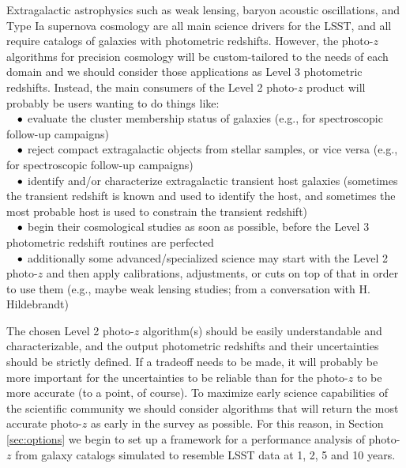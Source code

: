 \documentclass[DM,lsstdraft,toc]{lsstdoc}
\begin{document}
Extragalactic astrophysics such as weak lensing, baryon acoustic oscillations, and Type Ia supernova cosmology are all main science drivers for the LSST, and all require catalogs of galaxies with photometric redshifts. However, the photo-$z$ algorithms for precision cosmology will be custom-tailored to the needs of each domain and we should consider those applications as Level 3 photometric redshifts. Instead, the main consumers of the Level 2 photo-$z$ product will probably be users wanting to do things like: \\
${\rm \ \ \ }\bullet$ evaluate the cluster membership status of galaxies (e.g., for spectroscopic follow-up campaigns)\\
${\rm \ \ \ }\bullet$ reject compact extragalactic objects from stellar samples, or vice versa (e.g., for spectroscopic follow-up campaigns) \\
${\rm \ \ \ }\bullet$ identify and/or characterize extragalactic transient host galaxies (sometimes the transient redshift is known and used to identify the host, and sometimes the most probable host is used to constrain the transient redshift) \\
${\rm \ \ \ }\bullet$ begin their cosmological studies as soon as possible, before the Level 3 photometric redshift routines are perfected \\
${\rm \ \ \ }\bullet$ additionally some advanced/specialized science may start with the Level 2 photo-$z$ and then apply calibrations, adjustments, or cuts on top of that in order to use them (e.g., maybe weak lensing studies; from a conversation with H. Hildebrandt) 

\smallskip
The chosen Level 2 photo-$z$ algorithm(s) should be easily understandable and characterizable, and the output photometric redshifts and their uncertainties should be strictly defined. If a tradeoff needs to be made, it will probably be more important for the uncertainties to be reliable than for the photo-$z$ to be more accurate (to a point, of course). To maximize early science capabilities of the scientific community we should consider algorithms that will return the most accurate photo-$z$ as early in the survey as possible. For this reason, in Section \ref{sec:options} we begin to set up a framework for a performance analysis of photo-$z$ from galaxy catalogs simulated to resemble LSST data at 1, 2, 5 and 10 years.
\end{document}
